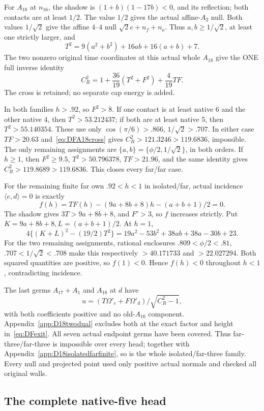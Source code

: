 \documentclass[11pt]{article}
\theoremstyle{definition}
\theoremstyle{remark}
\newcommand{\ip}[2]{\langle #1,#2\rangle}
\begin{document}
For \(A_{18}\) at \(n_{16}\), the shadow is
\((1+b)(1-17b)<0\), and its reflection; both contacts are
at least \(1/2\).
The value \(1/2\) gives the actual affine-\(A_2\) null.
Both values \(1/\sqrt2\) give the affine \(4\)--\(4\) null
\(\sqrt2e+n_f+n_o\).
Thus \(a,b\ge1/\sqrt2\), at least one strictly larger, and
\[
 T^2=9(a^2+b^2)+16ab+16(a+b)+7.
\]
The two nonzero original time coordinates at this actual
whole \(A_{18}\) give the ONE full inverse identity
\[
 C_R^2=1+{\frac{36}{19}}(T^2+F^2)+{\frac{4}{19}}TF .
\tag{DFA18cross}\label{eq:DFA18cross}
\]
The cross is retained; no separate cap energy is added.

In both families \(h>.92\), so \(F^2>8\).
If one contact is at least native 6 and the other native 4,
then \(T^2>53.212437\); if both are at least native 5,
then \(T^2>55.140354\).
These use only \(\cos(\pi/6)>.866\), \(1/\sqrt2>.707\).
In either case \(TF>20.63\) and~\eqref{eq:DFA18cross}
gives \(C_R^2>121.3246>119.6836\), impossible.
The only remaining assignments are
\(\{a,b\}=\{\phi/2,1/\sqrt2\}\), in both orders.
If \(h\ge1\), then \(F^2\ge9.5\), \(T^2>50.796378\),
\(TF>21.96\), and the same identity gives
\(C_R^2>119.8689>119.6836\).
This closes every far/far case.

For the remaining finite far own \(.92<h<1\) in isolated/far,
actual incidence \(\ip ed=0\) is exactly
\[
 f(h)=TF(h)-(9a+8b+8)h-(a+b+1)/2=0.
\]
The shadow gives \(3T>9a+8b+8\), and \(F'>3\), so \(f\)
increases strictly.
Put \(K=9a+8b+8,L=(a+b+1)/2\).
At \(h=1\),
\[
 4\{(K+L)^2-(19/2)T^2\}
   =19a^2-53b^2+38ab+38a-30b+23.
\]
For the two remaining assignments, rational enclosures
\(.809<\phi/2<.81\), \(.707<1/\sqrt2<.708\) make this
respectively \(>40.171733\) and \(>22.027294\).
Both squared quantities are positive, so \(f(1)<0\).
Hence \(f(h)<0\) throughout \(h<1\), contradicting incidence.

The last germs \(A_{17}+A_1\) and \(A_{18}\) at \(d\) have
\[
 u=(T\Omega'_e+F\Omega'_d)/\sqrt{C_R^2-1},
\]
with both coefficients positive and no old-\(A_{16}\) component.
Appendix~\ref{app:D18twodual} excludes both at the exact
factor and height in~\eqref{eq:DFexit}.
All seven actual endpoint germs have been covered.
Thus far-three/far-three is impossible over every head;
together with Appendix~\ref{app:D18isolatedfarfinite},
so is the whole isolated/far-three family.
Every null and projected point used only positive actual normals
and checked all original walls.

\subsection{The complete native-five head}
\label{app:D18nativefive}
\end{document}
